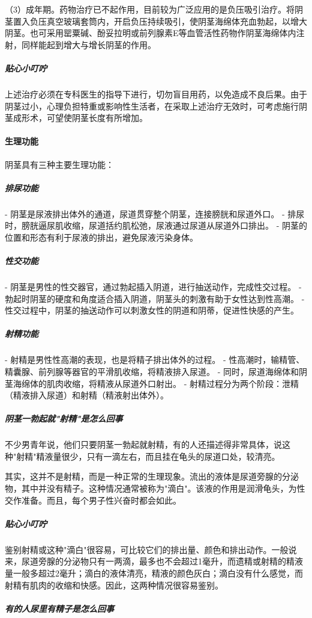 \begin{enumerate}
（3）成年期。药物治疗已不起作用，目前较为广泛应用的是负压吸引治疗。将阴茎置入负压真空玻璃套筒内，开启负压持续吸引，使阴茎海绵体充血勃起，以增大阴茎。也可采用罂粟碱、酚妥拉明或前列腺素E等血管活性药物作阴茎海绵体内注射，同样能起到增大与增长阴茎的作用。

\subparagraph{贴心小叮咛}

上述治疗必须在专科医生的指导下进行，切勿盲目用药，以免造成不良后果。由于阴茎过小，心理负担特重或影响性生活者，在采取上述治疗无效时，可考虑施行阴茎成形术，可望使阴茎长度有所增加。

\paragraph{生理功能}

阴茎具有三种主要生理功能：

\subparagraph{排尿功能}
- 阴茎是尿液排出体外的通道，尿道贯穿整个阴茎，连接膀胱和尿道外口。
- 排尿时，膀胱逼尿肌收缩，尿道括约肌松弛，尿液通过尿道从尿道外口排出。
- 阴茎的位置和形态有利于尿液的排出，避免尿液污染身体。

\subparagraph{性交功能}
- 阴茎是男性的性交器官，通过勃起插入阴道，进行抽送动作，完成性交过程。
- 勃起时阴茎的硬度和角度适合插入阴道，阴茎头的刺激有助于女性达到性高潮。
- 性交过程中，阴茎的抽送动作可以刺激女性的阴道和阴蒂，促进性快感的产生。

\subparagraph{射精功能}
- 射精是男性性高潮的表现，也是将精子排出体外的过程。
- 性高潮时，输精管、精囊腺、前列腺等器官的平滑肌收缩，将精液排入尿道。
- 同时，尿道海绵体和阴茎海绵体的肌肉收缩，将精液从尿道外口射出。
- 射精过程分为两个阶段：泄精（精液排入尿道）和射精（精液射出体外）。

\subparagraph{阴茎一勃起就"射精"是怎么回事}

不少男青年说，他们只要阴茎一勃起就射精，有的人还描述得非常具体，说这种"射精"精液量很少，只有一滴左右，而且挂在龟头的尿道口处，较清亮。

其实，这并不是射精，而是一种正常的生理现象。流出的液体是尿道旁腺的分泌物，其中并没有精子。这种情况通常被称为"滴白"。该液的作用是润滑龟头，为性交作准备。而且，每个男子性兴奋时都会如此。

\subparagraph{贴心小叮咛}

鉴别射精或这种"滴白"很容易，可比较它们的排出量、颜色和排出动作。一般说来，尿道旁腺的分泌物只有一两滴，最多也不会超过1毫升，而遗精或射精的精液量一般多超过2毫升；滴白的液体清亮，精液的颜色灰白；滴白没有什么感觉，而射精有肌肉的收缩和快感。因此，这两种情况很容易鉴别。

\subparagraph{有的人尿里有精子是怎么回事}


\end{enumerate}
